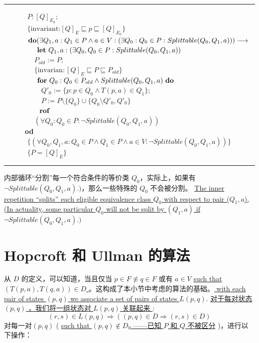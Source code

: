 \\
\rule{\textwidth}{1pt}
\mbox{　　　} $P:[Q]_{E_0};$ \\
\mbox{　　　} $\{ \mbox{invariant:} [Q]_E \sqsubseteq p \sqsubseteq [Q]_{E_0} \}$ \\
\mbox{　　　} $\mbox{\textbf{do}} ( \exists Q_1,a : Q_1 \in P \land a \in V : ( \exists Q_0 : Q_0 \in P : Splittable ( Q_0 , Q_1, a ) ) ) \longrightarrow $ \\
\mbox{　　　　} $ \mbox{ \textbf{let} } Q_1 ,a : ( \exists Q_0,Q_0 \in P : Splittable (Q_0,Q_1,a))  $ \\
\mbox{　　　　} $ P_{old} := P ; $ \\
\mbox{　　　　} $ \{ \mbox{invarian} : [Q]_E \sqsubseteq P \sqsubseteq P_{old}  \} $ \\
\mbox{　　　　} $ \mbox{ \textbf{for} }  Q_0: Q_0 \in P_{old} \land Splittable (Q_0, Q_1, a) \mbox{ \textbf{do} } $ \\
\mbox{　　　　　} $ Q'_0 := \{  p:p \in Q_0 \land T(p,a) \in Q_1 \} ; $ \\
\mbox{　　　　　} $ P:= P \setminus \{  Q_0 \} \cup \{ Q_0 \setminus Q'_0,Q'_0   \} $ \\
\mbox{　　　　} $ \mbox{  \textbf{ rof }} $ \\
\mbox{　　　　} $ (\forall Q_0:Q_0 \in P : \neg Splittable ( Q_0,Q_1,a)) $ \\
\mbox{　　　\textbf{od}}\\
\mbox{　　　} $ \{ (\forall Q_0,Q_1,a : Q_0 \in P \land Q_1 \in P \land a \in V : \neg Splittable (Q_0,Q_1,a))  \} $ \\
\mbox{　　　} $\{  P = [Q]_E \}$ \\
\rule{\textwidth}{1pt}
内部循环“分割”每一个符合条件的等价类 $Q_0$，实际上，如果有$\neg Splittable(Q_0,Q_1,a).)$，那么一些特殊的 $Q_0$ 不会被分割。
\uline{The inner repetition “splits” each eligible equivalence class $Q_0$ with respect to pair ($Q_1,a$), (In actuality, some particular $Q_0$ will not be split by $(Q_1,a)$ if $\neg Splittable(Q_0,Q_1,a).)$}

\section{Hopcroft 和 Ullman 的算法 }

从 $D$ 的定义，可以知道，当且仅当 $p \in F \not\equiv q \in F$ 或有 $a\in V$ \uline{such that $(T(p,a),T(q,a)) \in D$ }。这构成了本小节中考虑的算法的基础。\uline{ with each pair of states $(p,q)$ we associate a set of pairs of states $L(p,q)$}. 
\uline{ 对于每对状态 $(p,q)$ ，我们将一组状态对 $L(p,q)$ 关联起来 }:
$$ (r,s) \in L(p,q) \Rightarrow ((p,q) \in D \Rightarrow (r,s) \in D) $$
对每一对$(p,q)$ ( \uline{such that $ (p,q) \not\in D_0 $ ——已知 $P$ 和 $Q$ 不被区分} )，进行以下操作：

